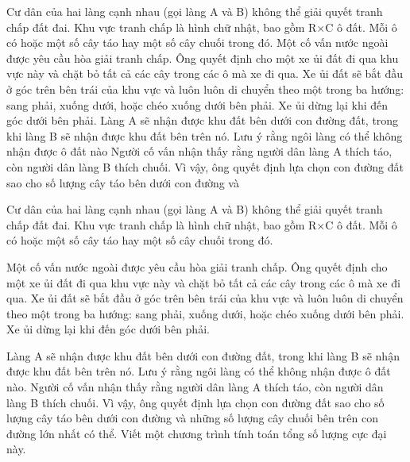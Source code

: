Cư dân của hai làng cạnh nhau (gọi làng A và B) không thể giải quyết tranh chấp đất đai. Khu       vực tranh chấp là hình chữ nhật, bao gồm R×C ô đất. Mỗi ô có hoặc một số cây táo hay một số       cây chuối trong đó.       Một cố vấn nước ngoài được yêu cầu hòa giải tranh chấp. Ông quyết định cho một xe ủi đất đi       qua khu vực này và chặt bỏ tất cả các cây trong các ô mà xe đi qua. Xe ủi đất sẽ bắt đầu ở góc       trên bên trái của khu vực và luôn luôn di chuyển theo một trong ba hướng: sang phải, xuống       dưới, hoặc chéo xuống dưới bên phải. Xe ủi dừng lại khi đến góc dưới bên phải.       Làng A sẽ nhận được khu đất bên dưới con đường đất, trong khi làng B sẽ nhận được khu đất       bên trên nó. Lưu ý rằng ngôi làng có thể không nhận được ô đất nào       Người cố vấn nhận thấy rằng người dân làng A thích táo, còn người dân làng B thích chuối. Vì       vậy, ông quyết định lựa chọn con đường đất sao cho số lượng cây táo bên dưới con đường và    

   Cư dân của hai làng cạnh nhau (gọi làng A và B) không thể giải quyết tranh chấp đất đai. Khu vực tranh chấp là hình chữ nhật, bao gồm R×C ô đất. Mỗi ô có hoặc một số cây táo hay một số cây chuối trong đó.  

   Một cố vấn nước ngoài được yêu cầu hòa giải tranh chấp. Ông quyết định cho một xe ủi đất đi qua khu vực này và chặt bỏ tất cả các cây trong các ô mà xe đi qua. Xe ủi đất sẽ bắt đầu ở góc trên bên trái của khu vực và luôn luôn di chuyển theo một trong ba hướng: sang phải, xuống dưới, hoặc chéo xuống dưới bên phải. Xe ủi dừng lại khi đến góc dưới bên phải.  

   Làng A sẽ nhận được khu đất bên dưới con đường đất, trong khi làng B sẽ nhận được khu đất bên trên nó. Lưu ý rằng ngôi làng có thể không nhận được ô đất nào. Người cố vấn nhận thấy rằng người dân làng A thích táo, còn người dân làng B thích chuối. Vì vậy, ông quyết định lựa chọn con đường đất sao cho số lượng cây táo bên dưới con đường và những số lượng cây chuối bên trên con đường lớn nhất có thể. Viết một chương trình tính toán tổng số lượng cực đại này.